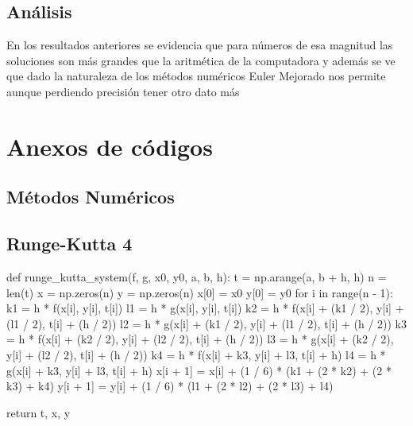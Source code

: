 \documentclass{article}
\begin{document}
          \subsection*{Análisis}
             En los resultados anteriores se evidencia que para números de esa magnitud las soluciones 
             son más grandes que la aritmética de la computadora y además se ve que dado la naturaleza de los
             métodos numéricos Euler Mejorado nos permite aunque perdiendo precisión tener otro dato más

  \section*{Anexos de códigos}
        \subsection*{Métodos Numéricos}
        \newpage
          \subsection*{Runge-Kutta 4}
          
            \begin{python}
              
              def runge_kutta_system(f, g, x0, y0, a, b, h):
                t = np.arange(a, b + h, h)
                n = len(t)
                x = np.zeros(n)
                y = np.zeros(n)
                x[0] = x0
                y[0] = y0
                for i in range(n - 1):
                    k1 = h * f(x[i], y[i], t[i])
                    l1 = h * g(x[i], y[i], t[i])
                    k2 = h * f(x[i] + (k1 / 2), y[i] + (l1 / 2), t[i] + (h / 2))
                    l2 = h * g(x[i] + (k1 / 2), y[i] + (l1 / 2), t[i] + (h / 2))
                    k3 = h * f(x[i] + (k2 / 2), y[i] + (l2 / 2), t[i] + (h / 2))
                    l3 = h * g(x[i] + (k2 / 2), y[i] + (l2 / 2), t[i] + (h / 2))
                    k4 = h * f(x[i] + k3, y[i] + l3, t[i] + h)
                    l4 = h * g(x[i] + k3, y[i] + l3, t[i] + h)
                    x[i + 1] = x[i] + (1 / 6) * (k1 + (2 * k2) + (2 * k3) + k4)
                    y[i + 1] = y[i] + (1 / 6) * (l1 + (2 * l2) + (2 * l3) + l4)
            
                return t, x, y   
            \end{python}
\end{document}
